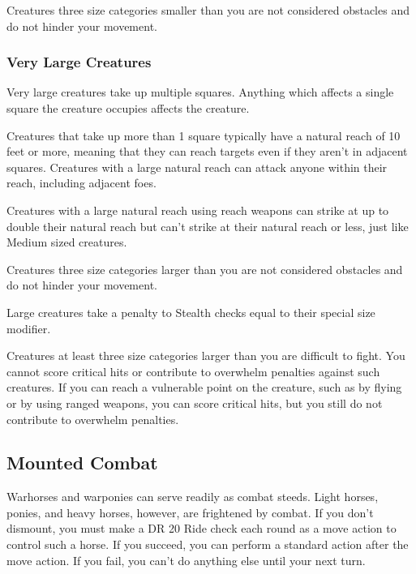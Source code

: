              Creatures three size categories smaller than you are not considered obstacles and do not hinder your movement.

        \subsubsection{Very Large Creatures}
             Very large creatures take up multiple squares. Anything which affects a single square the creature occupies affects the creature.

             Creatures that take up more than 1 square typically have a natural reach of 10 feet or more, meaning that they can reach targets even if they aren't in adjacent squares. Creatures with a large natural reach can attack anyone within their reach, including adjacent foes.

            Creatures with a large natural reach using reach weapons can strike at up to double their natural reach but can't strike at their natural reach or less, just like Medium sized creatures.

             Creatures three size categories larger than you are not considered obstacles and do not hinder your movement.

             Large creatures take a penalty to Stealth checks equal to their special size modifier.

             Creatures at least three size categories larger than you are difficult to fight. You cannot score critical hits or contribute to overwhelm penalties against such creatures. If you can reach a vulnerable point on the creature, such as by flying or by using ranged weapons, you can score critical hits, but you still do not contribute to overwhelm penalties.

    \subsection{Mounted Combat}\label{Mounted Combat}
         Warhorses and warponies can serve readily as combat steeds. Light horses, ponies, and heavy horses, however, are frightened by combat. If you don't dismount, you must make a DR 20 Ride check each round as a move action to control such a horse. If you succeed, you can perform a standard action after the move action. If you fail, you can't do anything else until your next turn.

